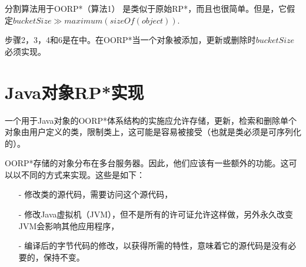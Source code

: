 \documentclass[10pt,a4paper]{article}
\begin{document}
\begin{CJK*}{UTF8}{gkai}
分割算法用于OORP*（算法1） \cite{16}是类似于原始RP*\cite{7}，而且也很简单。但是，它假定$bucketSize ≫ maximum( sizeOf(object))$.


步骤2，3，4和6是在\cite{7}中。在OORP*当一个对象被添加，更新或删除时$bucketSize$必须实现。


\section{Java对象RP*实现}
一个用于Java对象的OORP*体系结构的实施应允许存储，更新，检索和删除单个对象由用户定义的类，限制类上，这可能是容易被接受（也就是类必须是可序列化的）。


OORP*存储的对象分布在多台服务器。因此，他们应该有一些额外的功能。这可以以不同的方式来实现。这些是如下：
\begin{itemize}
\item[-] 修改类的源代码，需要访问这个源代码，
\item[-] 修改Java虚拟机（JVM），但不是所有的许可证允许这样做，另外永久改变JVM会影响其他应用程序，
\item[-] 编译后的字节代码的修改，以获得所需的特性，意味着它的源代码是没有必要的，保持不变。
\end{itemize}



\end{CJK*}
\end{document}
